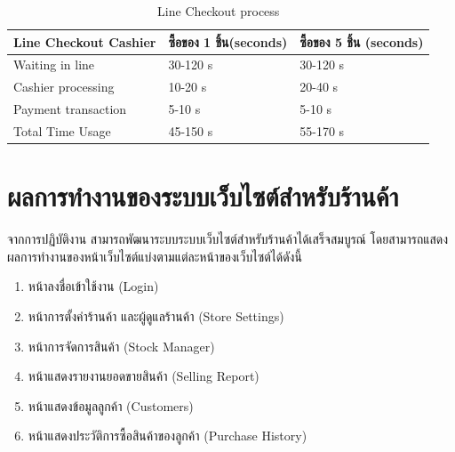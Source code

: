 \begin{table}[]
    \centering
    \caption{Line Checkout process}
    \begin{tabular}{|p{5cm}|p{4cm}|p{4cm}|}
        \hline
        \textbf{Line Checkout Cashier} & \textbf{ซื้อของ 1 ชิ้น(seconds)} & \textbf{ซื้อของ 5 ชิ้น (seconds)} \\
        \hline
        Waiting in line                & 30-120 s                     & 30-120 s                      \\
        Cashier processing             & 10-20 s                      & 20-40 s                       \\
        Payment transaction            & 5-10 s                       & 5-10 s                        \\
        \hline
        Total Time Usage               & 45-150 s                     & 55-170 s                      \\
        \hline
    \end{tabular}
\end{table}

\newpage
\section{ผลการทำงานของระบบเว็บไซต์สำหรับร้านค้า}
จากการปฏิบัติงาน สามารถพัฒนาระบบระบบเว็บไซต์สำหรับร้านค้าได้เสร็จสมบูรณ์ โดยสามารถแสดงผลการทำงานของหน้าเว็บไซต์แบ่งตามแต่ละหน้าของเว็บไซต์ได้ดังนี้
\begin{enumerate}
    \item หน้าลงชื่อเข้าใช้งาน (Login)
    \item หน้าการตั้งค่าร้านค้า และผู้ดูแลร้านค้า (Store Settings)
    \item หน้าการจัดการสินค้า (Stock Manager)
    \item หน้าแสดงรายงานยอดขายสินค้า (Selling Report)
    \item หน้าแสดงข้อมูลลูกค้า (Customers)
    \item หน้าแสดงประวัติการซื้อสินค้าของลูกค้า (Purchase History)
\end{enumerate}

